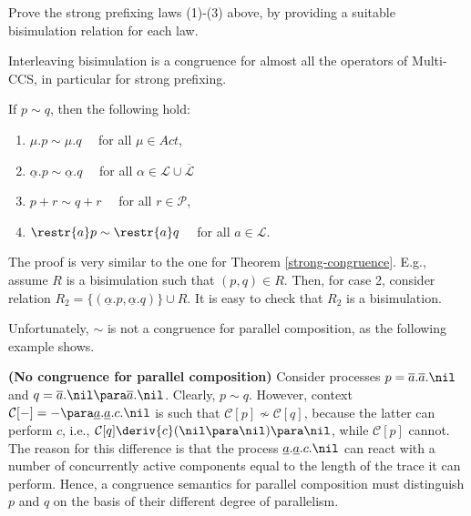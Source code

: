 \begin{exercise}
Prove the strong prefixing laws (1)-(3) above, by providing a suitable bisimulation relation for each law.
\fine
\end{exercise}

Interleaving bisimulation is a congruence for almost all the operators of Multi-CCS, in particular for strong prefixing.

\begin{proposition}
If $p \sim q$, then the following hold:
\begin{enumerate}
\item  $\mu.p \sim \mu.q \quad$ for all $\mu \in Act$,
\item $\underline{\alpha}.p \sim \underline{\alpha}.q \quad$ for all $\alpha \in \mathcal{L}\cup\overline{\mathcal{L}}$
\item $p + r \sim q + r \quad $ for all  $r \in \mathcal{P}$,
\item $\restr{a}p \sim \restr{a}q \quad$ for all $a \in \mathcal{L}$.
\end{enumerate}

\proof
The proof is very similar to the one for Theorem \ref{strong-congruence}. E.g., 
assume $R$ is a bisimulation such that $(p, q) \in R$.
Then, for case 2,  consider relation $R_2 = \{(\underline\alpha.p, \underline\alpha.q)\} \cup R$. 
It is easy to check that $R_2$ is a bisimulation.
\fine
\end{proposition}

Unfortunately, $\sim$ is not a congruence for parallel composition, as the following example shows.

\begin{example}\label{sim-no-cong}{\bf (No congruence for parallel composition)}
Consider processes $p = \overline{a}.\overline{a}.\nil$ and  $q = \overline{a}.\nil \para \overline{a}.\nil$.
Clearly, $p \sim q$. However, context $\mathcal{C}[-] =  - \para \underline{a}.\underline{a}.c.\nil$ is such
that $\mathcal{C}[p] \not\sim \mathcal{C}[q]$, because the latter can perform $c$, i.e., 
$\mathcal{C}[q] \deriv{c} (\nil \para \nil) \para \nil$, 
while $\mathcal{C}[p]$ cannot. The reason for this
difference is that the process $\underline{a}.\underline{a}.c.\nil$ can react with a number of concurrently active components
equal to the length of the trace it can perform. Hence, a congruence semantics 
for parallel composition must distinguish $p$ and $q$ on the basis of their different degree of parallelism.
\fine
\end{example}

